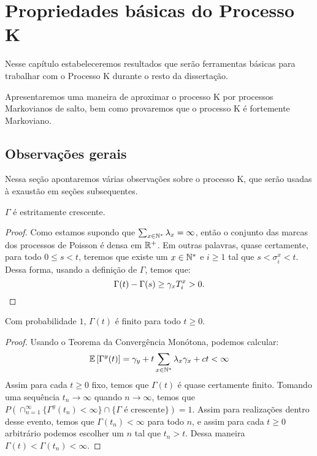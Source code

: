 \chapter{Propriedades básicas do Processo K}
\label{cap:propriedades}

Nesse capítulo estabeleceremos resultados que serão ferramentas
básicas para trabalhar com o Processo K durante o resto da
dissertação.

Apresentaremos uma maneira de aproximar o processo K por processos
Markovianos de salto, bem como provaremos que o processo K é
fortemente Markoviano.


\section{Observações gerais}
\label{sec:observacoes}

Nessa seção apontaremos várias observações sobre o processo K, que
serão usadas à exaustão em seções subsequentes.

\begin{proposicao}
  \label{prop:gamma-crescente}
  $\Gamma$ é \qc estritamente crescente.
\end{proposicao}
\begin{proof}
  Como estamos supondo que $\sum_{x \in {\mathbb{N^*}}} \lambda_x = \infty$,
  então o conjunto das marcas dos processos de Poisson é \qc densa em
  ${\mathbb{R}}^+$. Em outras palavras, quase certamente, para todo $0 \leq s <
  t$, teremos que existe um $x \in {\mathbb{N^*}}$ e $i \geq 1$ tal que $s <
  \sigma^x_i < t$. Dessa forma, usando a definição de $\Gamma$, temos
  que:
  \begin{displaymath}
    \Gamma(t) - \Gamma(s) \geq \gamma_x T^x_i > 0.
    \qedhere
  \end{displaymath}
\end{proof}

\begin{proposicao}
  \label{prop:gamma-finita}
  Com probabilidade $1$, $\Gamma(t)$ é finito para todo $t \geq 0$.
\end{proposicao}
\begin{proof}
  Usando o Teorema da Convergência Monótona, podemos calcular:
  \begin{displaymath}
    {\mathbb{E}} \left[\Gamma^y(t) \right] = \gamma_y + t \sum_{x \in {\mathbb{N^*}}}
    \lambda_x \gamma_x + ct < \infty
  \end{displaymath}
  Assim para cada $t \geq 0$ fixo, temos que $\Gamma(t)$ é quase
  certamente finito. Tomando uma sequência $t_n \to \infty$ quando $n
  \to \infty$, temos que $P(\cap_{n = 1}^{\infty} \{ \Gamma^y (t_n)
  < \infty \} \cap \{ \Gamma \textrm{ é crescente}\}) = 1$. Assim para
  realizações dentro desse evento, temos que $\Gamma(t_n) < \infty$
  para todo $n$, e assim para cada $t \geq 0$ arbitrário podemos
  escolher um $n$ tal que $t_n > t$. Dessa maneira $\Gamma(t) <
  \Gamma(t_n) < \infty$.
\end{proof}


